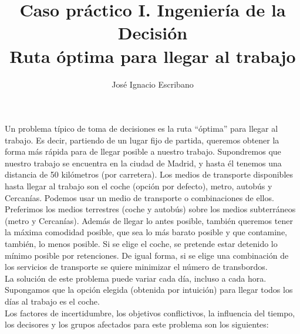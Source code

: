 \documentclass[12pt,a4paper,openright,final]{article}
\author{José Ignacio Escribano}
\title{Caso práctico I. Ingeniería de la Decisión \\ \textbf{Ruta óptima para llegar al trabajo}}
\begin{document}
\maketitle

Un problema típico de toma de decisiones es la ruta ``óptima'' para llegar al trabajo. Es decir, partiendo de un lugar fijo de partida, queremos obtener la forma más rápida para de llegar posible a nuestro trabajo. Supondremos que nuestro trabajo se encuentra en la ciudad de Madrid, y hasta él tenemos una distancia de 50 kilómetros (por carretera). Los medios de transporte disponibles hasta llegar al trabajo son el coche (opción por defecto), metro, autobús y Cercanías. Podemos usar un medio de transporte o combinaciones de ellos. Preferimos los medios terrestres (coche y autobús) sobre los medios subterráneos (metro y Cercanías). Además de llegar lo antes posible, también queremos tener la máxima comodidad posible, que sea lo más barato posible y que contamine, también, lo menos posible. Si se elige el coche, se pretende estar detenido lo mínimo posible por retenciones. De igual forma, si se elige una combinación de los servicios de transporte se quiere minimizar el número de transbordos.\\

La solución de este problema puede variar cada día, incluso a cada hora. Supongamos que la opción elegida (obtenida por intuición) para llegar todos los días al trabajo es el coche.\\

Los factores de incertidumbre, los objetivos conflictivos, la influencia del tiempo, los decisores y los grupos afectados para este problema son los siguientes:
\end{document}
